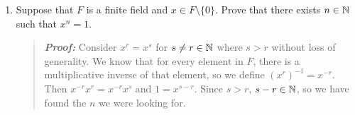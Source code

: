 \documentclass{hw}
\begin{document}
\begin{enumerate}
\item Suppose that $F$ is a finite field and $x\in F\setminus\{0\}$. Prove that there exists $n\in\mathbb{N}$ such that $x^{n}=1$.
\begin{quote}
\textit{\textbf{Proof:}} Consider $x^{r}=x^{s}$ for $s\neq r\in\mathbb{N}$ where $s>r$ without loss of generality. We know that for every element in $F$, there is a multiplicative inverse of that element, so we define $(x^{r})^{-1}=x^{-r}$. Then $x^{-r}x^{r}=x^{-r}x^{s}$ and $1=x^{s-r}$. Since $s>r$, $s-r\in\mathbb{N}$, so we have found the $n$ we were looking for.
\end{quote}
\end{enumerate}
\end{document}
